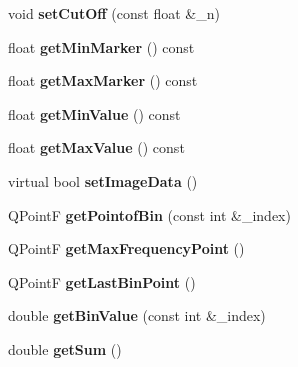 \begin{DoxyCompactItemize}
void {\bfseries set\+Cut\+Off} (const float \&\+\_\+n)
\item 
\mbox{\label{classBarScreen_a3619df2d1013dcd882836654bdc7eca8}} 
float {\bfseries get\+Min\+Marker} () const
\item 
\mbox{\label{classBarScreen_a8c31c0657a9eae009fae26a6095527af}} 
float {\bfseries get\+Max\+Marker} () const
\item 
\mbox{\label{classBarScreen_a8b1fd79efa17f74f838604cf28e82497}} 
float {\bfseries get\+Min\+Value} () const
\item 
\mbox{\label{classBarScreen_a6621f8fa1c402d63dd9ac1a29002eb38}} 
float {\bfseries get\+Max\+Value} () const
\item 
\mbox{\label{classBarScreen_ab9e1489e0b5d95f26fd7a00763e91d11}} 
virtual bool {\bfseries set\+Image\+Data} ()
\item 
\mbox{\label{classBarScreen_a3c553483ebb07bd496004d8300eb804f}} 
Q\+PointF {\bfseries get\+Pointof\+Bin} (const int \&\+\_\+index)
\item 
\mbox{\label{classBarScreen_acba5c2bfeac649e5ffdea5255a4537d8}} 
Q\+PointF {\bfseries get\+Max\+Frequency\+Point} ()
\item 
\mbox{\label{classBarScreen_a2a02e1300c43cebc6b61140e7aebc82c}} 
Q\+PointF {\bfseries get\+Last\+Bin\+Point} ()
\item 
\mbox{\label{classBarScreen_aad073d21512c112ca8892e1d7be7b21c}} 
double {\bfseries get\+Bin\+Value} (const int \&\+\_\+index)
\item 
\mbox{\label{classBarScreen_ab6abcfa2f17cd1abe87f33cd2de73683}} 
double {\bfseries get\+Sum} ()
\end{DoxyCompactItemize}

